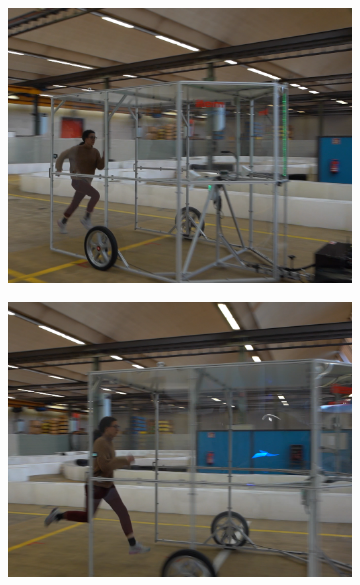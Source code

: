 \documentclass[a4paper,12pt,oneside]{book}
\begin{document}
\begin{figure}[h!]
\begin{subfigure}[b]{0.24\textwidth}
        \includegraphics[width=\textwidth]{SteadyState/ss3.png}
    \end{subfigure}
    \hfill
    \begin{subfigure}[b]{0.24\textwidth}
        \includegraphics[width=\textwidth]{SteadyState/ss4.png}
    \end{subfigure}
\\[0.2cm]
    \begin{subfigure}[b]{0.24\textwidth}

\end{subfigure}
\end{figure}
\end{document}
